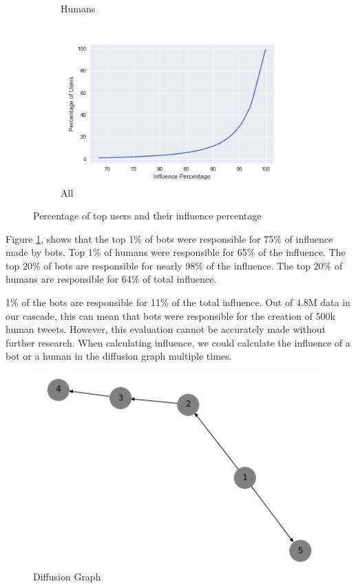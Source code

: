 \documentclass[letterpaper]{article}
\begin{document}
\begin{figure}
\begin{subfigure}[b]{0.4\linewidth}
      \caption{Humans}
    \end{subfigure}
    \begin{subfigure}[b]{0.8\linewidth}
        \includegraphics[width=\linewidth]{images/top_1per_all.png}
        \caption{All}
    \end{subfigure}
    \caption{Percentage of top users and their influence percentage}
    \label{fig:top_infuence}
\end{figure}

Figure \ref{fig:top_infuence}, shows that 
the top 1\% of bots were responsible for 75\% of influence made by bots. Top 1\% of humans were responsible for 65\% of the influence. The top 20\% of bots are responsible for nearly 98\% of the influence. The top 20\% of humans are responsible for 64\% of total influence. \par

1\% of the bots are responsible for 11\% of the total influence. Out of 4.8M data in our cascade, this can mean that
bots were responsible for the creation of 500k human tweets. However, this evaluation cannot be accurately made without further research. 
When calculating influence, we could calculate the influence of a bot or a human in the diffusion graph multiple times.

\begin{figure}[h!]
    \includegraphics[width=\linewidth]{images/diffusion_graph.png}
    \caption{Diffusion Graph}
    \label{fig:diff_graph}
\end{figure}
\end{document}
